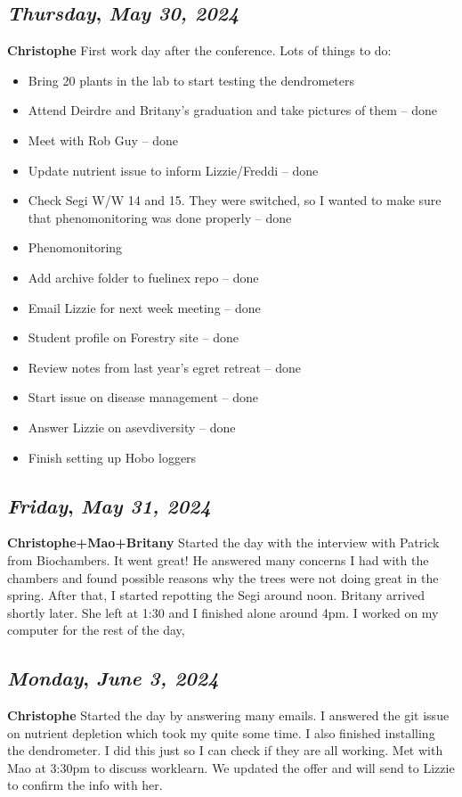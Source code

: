 \def\day{\textit{May 30, 2024}}
\def\weekday{\textit{Thursday}}
\subsection*{\weekday, \day}
\textbf{Christophe}
First work day after the conference. Lots of things to do:
\begin{itemize}
    \item Bring 20 plants in the lab to start testing the dendrometers
    \item Attend Deirdre and Britany's graduation and take pictures of them -- done
    \item Meet with Rob Guy -- done
    \item Update nutrient issue to inform Lizzie/Freddi -- done 
    \item Check Segi W/W 14 and 15. They were switched, so I wanted to make sure that phenomonitoring was done properly -- done
    \item Phenomonitoring
    \item Add archive folder to fuelinex repo  -- done
    \item Email Lizzie for next week meeting -- done
    \item Student profile on Forestry site -- done 
    \item Review notes from last year's egret retreat -- done
    \item Start issue on disease management -- done
    \item Answer Lizzie on asevdiversity -- done
    \item Finish setting up Hobo loggers 
\end{itemize}

\def\day{\textit{May 31, 2024}}
\def\weekday{\textit{Friday}}
\subsection*{\weekday, \day}
\textbf{Christophe+Mao+Britany}
Started the day with the interview with Patrick from Biochambers. It went great! He answered many concerns I had with the chambers and found possible reasons why the trees were not doing great in the spring. 
After that, I started repotting the Segi around noon. Britany arrived shortly later. She left at 1:30 and I finished alone around 4pm. I worked on my computer for the rest of the day, 

\def\day{\textit{June 3, 2024}}
\def\weekday{\textit{Monday}}
\subsection*{\weekday, \day}
\textbf{Christophe}
Started the day by answering many emails. I answered the git issue on nutrient depletion which took my quite some time. I also finished installing the dendrometer. I did this just so I can check if they are all working.
Met with Mao at 3:30pm to discuss worklearn. We updated the offer and will send to Lizzie to confirm the info with her. 






